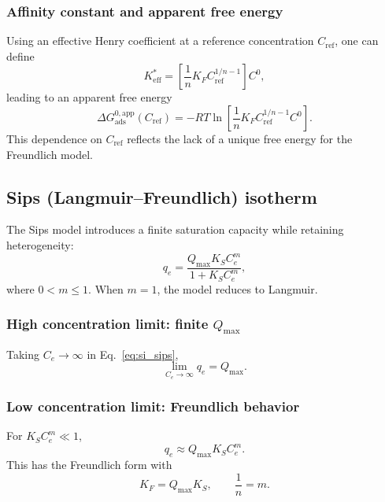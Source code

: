 \documentclass[journal=jacsat,manuscript=article]{achemso}
\begin{document}
\subsubsection{Affinity constant and apparent free energy}

Using an effective Henry coefficient at a reference concentration
\(C_{\mathrm{ref}}\), one can define
\begin{equation}
	K_{\mathrm{eff}}^{\ast}
	= \left[\frac{1}{n} K_F C_{\mathrm{ref}}^{1/n - 1}\right] C^0,
\end{equation}
leading to an apparent free energy
\begin{equation}
	\Delta G_{\mathrm{ads}}^{0,\mathrm{app}}(C_{\mathrm{ref}})
	= - R T \ln\!\left[
	\frac{1}{n} K_F C_{\mathrm{ref}}^{1/n - 1} C^0 \right].
\end{equation}
This dependence on \(C_{\mathrm{ref}}\) reflects the lack of a unique
free energy for the Freundlich model.

\subsection{Sips (Langmuir--Freundlich) isotherm}
\label{sec:si_sips}

The Sips model introduces a finite saturation capacity while retaining
heterogeneity:
\begin{equation}
	q_e = \frac{Q_{\max} K_S C_e^{m}}{1 + K_S C_e^{m}},
	\label{eq:si_sips}
\end{equation}
where \(0 < m \leq 1\). When \(m = 1\), the model reduces to Langmuir.

\subsubsection{High concentration limit: finite \(Q_{\max}\)}

Taking \(C_e \to \infty\) in Eq.~\eqref{eq:si_sips},
\begin{equation}
	\lim_{C_e \to \infty} q_e = Q_{\max}.
\end{equation}

\subsubsection{Low concentration limit: Freundlich behavior}

For \(K_S C_e^{m} \ll 1\),
\begin{equation}
	q_e \approx Q_{\max} K_S C_e^{m}.
\end{equation}
This has the Freundlich form with
\begin{equation}
	K_F = Q_{\max} K_S,
	\qquad \frac{1}{n} = m.
\end{equation}
\end{document}
